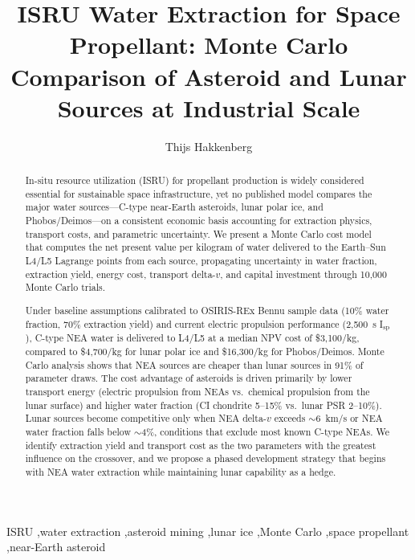 \documentclass[preprint,12pt]{elsarticle}
\begin{document}
\begin{frontmatter}

\title{ISRU Water Extraction for Space Propellant: Monte Carlo Comparison of Asteroid and Lunar Sources at Industrial Scale}

\author[dyson]{Thijs Hakkenberg}

\address[dyson]{Project Dyson, Open Research Initiative}

\begin{abstract}
In-situ resource utilization (ISRU) for propellant production is widely considered essential for sustainable space infrastructure, yet no published model compares the major water sources---C-type near-Earth asteroids, lunar polar ice, and Phobos/Deimos---on a consistent economic basis accounting for extraction physics, transport costs, and parametric uncertainty. We present a Monte Carlo cost model that computes the net present value per kilogram of water delivered to the Earth--Sun L4/L5 Lagrange points from each source, propagating uncertainty in water fraction, extraction yield, energy cost, transport delta-$v$, and capital investment through 10,000 Monte Carlo trials.

Under baseline assumptions calibrated to OSIRIS-REx Bennu sample data (10\% water fraction, 70\% extraction yield) and current electric propulsion performance (2,500~s I$_\text{sp}$), C-type NEA water is delivered to L4/L5 at a median NPV cost of \$3,100/kg, compared to \$4,700/kg for lunar polar ice and \$16,300/kg for Phobos/Deimos. Monte Carlo analysis shows that NEA sources are cheaper than lunar sources in 91\% of parameter draws. The cost advantage of asteroids is driven primarily by lower transport energy (electric propulsion from NEAs vs.\ chemical propulsion from the lunar surface) and higher water fraction (CI chondrite 5--15\% vs.\ lunar PSR 2--10\%). Lunar sources become competitive only when NEA delta-$v$ exceeds $\sim$6~km/s or NEA water fraction falls below $\sim$4\%, conditions that exclude most known C-type NEAs. We identify extraction yield and transport cost as the two parameters with the greatest influence on the crossover, and we propose a phased development strategy that begins with NEA water extraction while maintaining lunar capability as a hedge.
\end{abstract}

\begin{keyword}
ISRU \sep water extraction \sep asteroid mining \sep lunar ice \sep Monte Carlo \sep space propellant \sep near-Earth asteroid
\end{keyword}

\end{frontmatter}
\end{document}

